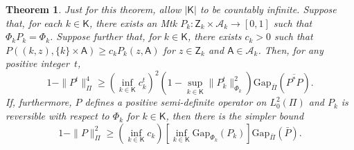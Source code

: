 \documentclass[12pt]{article}
\newcommand{\Z}{\mathsf{Z}}
\newcommand{\A}{\mathcal{A}}
\newtheorem{theorem}{Theorem}
\begin{document}
\begin{theorem} \label{thm:quantitative}
	Just for this theorem, allow $|\mathsf{K}|$ to be countably infinite.
	Suppose that, for each $k \in \mathsf{K}$, there exists an Mtk $P_k: \Z_k \times \A_k \to [0,1]$ such that $\Phi_k P_k = \Phi_k$.
	Suppose further that, for $k \in \mathsf{K}$, there exists $c_k > 0$ such that $P((k,z), \{k\} \times \mathsf{A}) \geq c_k P_k(z, \mathsf{A})$ for $z \in \Z_k$ and $\mathsf{A} \in \A_k$.
	Then, for any positive integer~$t$,
	\begin{equation} \label{ine:quantitative-1}
		1 - \|P^t\|_{\Pi}^4 \geq \left( \inf_{k \in \mathsf{K}} c_k^t \right)^2 \left( 1 - \sup_{k \in \mathsf{K}} \|P_k^t \|_{\Phi_k}^2 \right) \mbox{Gap}_{\bar{\Pi}}(\overline{P^*P}) .
	\end{equation}
	{If, furthermore, $P$ defines a positive semi-definite operator on $L_0^2(\Pi)$ and $P_k$ is reversible with respect to $\Phi_k$ for $k \in \mathsf{K}$, then there is the simpler bound
	\begin{equation} \label{ine:quantitative-2}
		1 - \|P\|_{\Pi}^2 \geq \left( \inf_{k \in \mathsf{K}} c_k \right) \left[ \inf_{k \in \mathsf{K}} \mbox{Gap}_{\Phi_k}(P_k) \right] \mbox{Gap}_{\bar{\Pi}}(\bar{P}).
	\end{equation}}
\end{theorem}
\end{document}
